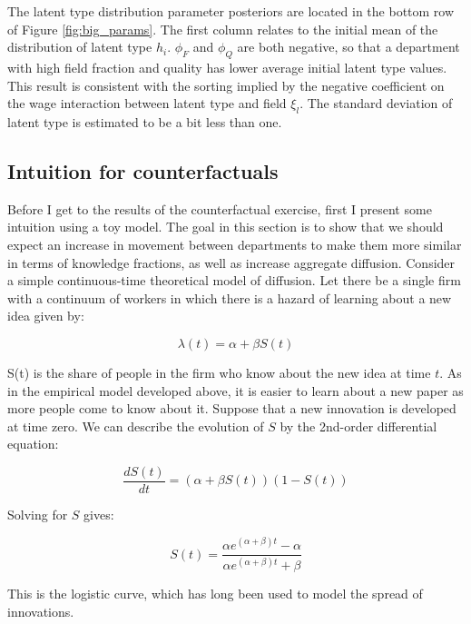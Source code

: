 \documentclass[]{article}
\begin{document}
The latent type distribution parameter posteriors are located in the bottom
row of Figure \ref{fig:big_params}. The first column relates to the initial
mean of the distribution of latent type $h_i$. $\phi_F$ and $\phi_Q$ are both negative, so that
a department with high field fraction and quality has lower average initial latent type values.  This result is consistent with
the sorting implied by the negative coefficient on the wage interaction between latent type and field $\xi_l$.
The standard deviation of latent type is estimated to be a bit less than one.

\subsection{Intuition for counterfactuals}
\label{sec:count_int}

Before I get to the results of the counterfactual exercise, first I present some
intuition using a toy model.  The goal in this section is to show that we should expect
an increase in movement between departments to make them more similar in terms of knowledge fractions,
as well as increase aggregate diffusion.  Consider a simple continuous-time theoretical model of
diffusion. Let there be a single firm with a continuum of workers in
which there is a hazard of learning about a new idea given by:

\begin{equation}
    \lambda(t) = \alpha + \beta S(t)
\end{equation}

S(t) is the share of people in the firm who know about the new idea at
time $t$. As in the empirical model
developed above, it is easier to learn about a new paper as
more people come to know about it. Suppose that a new innovation is developed at time
zero. We can describe the evolution of $S$ by the 2nd-order differential
equation:

\begin{equation}
    \frac{dS(t)}{d t} = \left( \alpha + \beta S(t) \right) \left(1 - S(t)\right)
    \label{eq:difeq_orig}
\end{equation}

Solving for $S$ gives:

\begin{equation}
    S(t) = \frac{\alpha e^{\left(\alpha + \beta \right) t} - \alpha}{\alpha e^{\left(\alpha + \beta \right) t} + \beta}
    \label{eq:difeq}
\end{equation}

This is the logistic curve, which has long been used to model the spread
of innovations.
\end{document}
